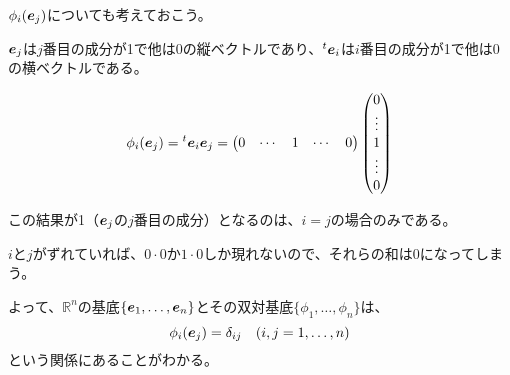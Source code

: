 \documentclass[../../../topic_linear-algebra]{subfiles}
\begin{document}
\br

$\phi_i(\vb*{e}_j)$についても考えておこう。

$\vb*{e}_j$は$j$番目の成分が1で他は0の縦ベクトルであり、${}^t\vb*{e}_i$は$i$番目の成分が1で他は0の横ベクトルである。

\begin{equation*}
  \phi_i(\vb*{e}_j) = {}^t\vb*{e}_i \vb*{e}_j = \begin{pmatrix}
    0 & \cdots & 1 & \cdots & 0
  \end{pmatrix} \begin{pmatrix}
    0 \\
    \vdots \\
    1 \\
    \vdots \\
    0
  \end{pmatrix}
\end{equation*}

この結果が1（$\vb*{e}_j$の$j$番目の成分）となるのは、$i=j$の場合のみである。

$i$と$j$がずれていれば、$0 \cdot 0$か$1 \cdot 0$しか現れないので、それらの和は0になってしまう。

\br

よって、$\mathbb{R}^n$の基底$\{ \vb*{e}_1, \ldots, \vb*{e}_n \}$とその双対基底$\{ \phi_1, \ldots, \phi_n \}$は、
\begin{equation*}
  \phi_i(\vb*{e}_j) = \delta_{ij} \quad (i,j=1,\ldots,n)
\end{equation*}
という関係にあることがわかる。
\end{document}
